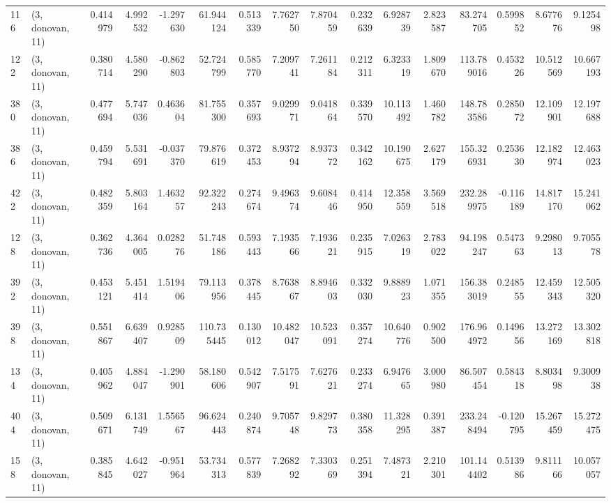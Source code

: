 \begin{tabular}{llrrrrrrrrrrrrrr}
116 &  (3, donovan, 11) &   0.414979 &   4.992532 &  -1.297630 &    61.944124 &   0.513339 &   7.762750 &   7.870459 &  0.232639 &   6.928739 &   2.823587 &    83.274705 &   0.599852 &   8.677676 &   9.125498 \\
122 &  (3, donovan, 11) &   0.380714 &   4.580290 &  -0.862803 &    52.724799 &   0.585770 &   7.209741 &   7.261184 &  0.212311 &   6.323319 &   1.809670 &   113.789016 &   0.453226 &  10.512569 &  10.667193 \\
380 &  (3, donovan, 11) &   0.477694 &   5.747036 &   0.463604 &    81.755300 &   0.357693 &   9.029971 &   9.041864 &  0.339570 &  10.113492 &   1.460782 &   148.783586 &   0.285072 &  12.109901 &  12.197688 \\
386 &  (3, donovan, 11) &   0.459794 &   5.531691 &  -0.037370 &    79.876619 &   0.372453 &   8.937294 &   8.937372 &  0.342162 &  10.190675 &   2.627179 &   155.326931 &   0.253630 &  12.182974 &  12.463023 \\
422 &  (3, donovan, 11) &   0.482359 &   5.803164 &   1.463257 &    92.322243 &   0.274674 &   9.496374 &   9.608446 &  0.414950 &  12.358559 &   3.569518 &   232.289975 &  -0.116189 &  14.817170 &  15.241062 \\
128 &  (3, donovan, 11) &   0.362736 &   4.364005 &   0.028276 &    51.748186 &   0.593443 &   7.193566 &   7.193621 &  0.235915 &   7.026319 &   2.783022 &    94.198247 &   0.547363 &   9.298013 &   9.705578 \\
392 &  (3, donovan, 11) &   0.453121 &   5.451414 &   1.519406 &    79.113956 &   0.378445 &   8.763867 &   8.894603 &  0.332030 &   9.888923 &   1.071355 &   156.383019 &   0.248555 &  12.459343 &  12.505320 \\
398 &  (3, donovan, 11) &   0.551867 &   6.639407 &   0.928509 &   110.735445 &   0.130012 &  10.482047 &  10.523091 &  0.357274 &  10.640776 &   0.902500 &   176.964972 &   0.149656 &  13.272169 &  13.302818 \\
134 &  (3, donovan, 11) &   0.405962 &   4.884047 &  -1.290901 &    58.180606 &   0.542907 &   7.517591 &   7.627621 &  0.233274 &   6.947665 &   3.000980 &    86.507454 &   0.584318 &   8.803498 &   9.300938 \\
404 &  (3, donovan, 11) &   0.509671 &   6.131749 &   1.556567 &    96.624443 &   0.240874 &   9.705748 &   9.829773 &  0.380358 &  11.328295 &   0.391387 &   233.248494 &  -0.120795 &  15.267459 &  15.272475 \\
158 &  (3, donovan, 11) &   0.385845 &   4.642027 &  -0.951964 &    53.734313 &   0.577839 &   7.268292 &   7.330369 &  0.251394 &   7.487321 &   2.210301 &   101.144402 &   0.513986 &   9.811166 &  10.057057 \\

\end{tabular}
